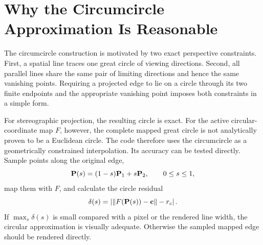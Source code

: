 \section{Why the Circumcircle Approximation Is Reasonable}
The circumcircle construction is motivated by two exact perspective constraints.  First, a spatial line traces one great circle of viewing directions.  Second, all parallel lines share the same pair of limiting directions and hence the same vanishing points.  Requiring a projected edge to lie on a circle through its two finite endpoints and the appropriate vanishing point imposes both constraints in a simple form.

For stereographic projection, the resulting circle is exact.  For the active circular-coordinate map $F$, however, the complete mapped great circle is not analytically proven to be a Euclidean circle.  The code therefore uses the circumcircle as a geometrically constrained interpolation.  Its accuracy can be tested directly.  Sample points along the original edge,
\begin{equation}
  \vb P(s)=(1-s)\vb P_1+s\vb P_2,
  \qquad 0\leq s\leq1,
\end{equation}
map them with $F$, and calculate the circle residual
\begin{equation}
  \delta(s)=
  \left|
  \lVert F(\vb P(s))-\vb c\rVert-r_c
  \right|.
  \label{eq:circle-residual}
\end{equation}
If $\max_s\delta(s)$ is small compared with a pixel or the rendered line width, the circular approximation is visually adequate.  Otherwise the sampled mapped edge should be rendered directly.

